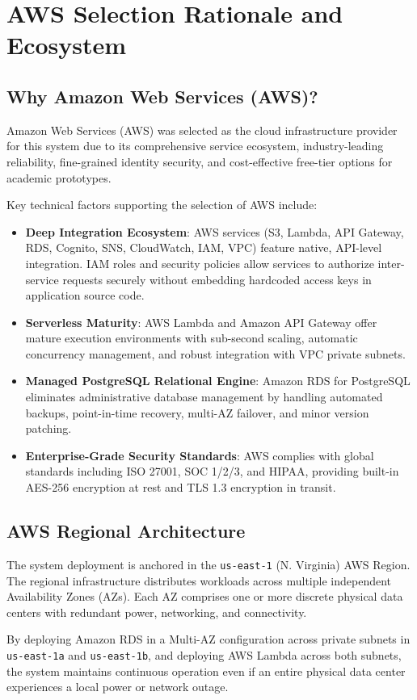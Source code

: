 \chapter{AWS Selection Rationale and Ecosystem}
\label{chap:aws_overview}

\section{Why Amazon Web Services (AWS)?}
Amazon Web Services (AWS) was selected as the cloud infrastructure provider for this system due to its comprehensive service ecosystem, industry-leading reliability, fine-grained identity security, and cost-effective free-tier options for academic prototypes. 

Key technical factors supporting the selection of AWS include:
\begin{itemize}
    \item \textbf{Deep Integration Ecosystem}: AWS services (S3, Lambda, API Gateway, RDS, Cognito, SNS, CloudWatch, IAM, VPC) feature native, API-level integration. IAM roles and security policies allow services to authorize inter-service requests securely without embedding hardcoded access keys in application source code.
    \item \textbf{Serverless Maturity}: AWS Lambda and Amazon API Gateway offer mature execution environments with sub-second scaling, automatic concurrency management, and robust integration with VPC private subnets.
    \item \textbf{Managed PostgreSQL Relational Engine}: Amazon RDS for PostgreSQL eliminates administrative database management by handling automated backups, point-in-time recovery, multi-AZ failover, and minor version patching.
    \item \textbf{Enterprise-Grade Security Standards}: AWS complies with global standards including ISO 27001, SOC 1/2/3, and HIPAA, providing built-in AES-256 encryption at rest and TLS 1.3 encryption in transit.
\end{itemize}

\section{AWS Regional Architecture}
The system deployment is anchored in the \texttt{us-east-1} (N. Virginia) AWS Region. The regional infrastructure distributes workloads across multiple independent Availability Zones (AZs). Each AZ comprises one or more discrete physical data centers with redundant power, networking, and connectivity.

By deploying Amazon RDS in a Multi-AZ configuration across private subnets in \texttt{us-east-1a} and \texttt{us-east-1b}, and deploying AWS Lambda across both subnets, the system maintains continuous operation even if an entire physical data center experiences a local power or network outage.
